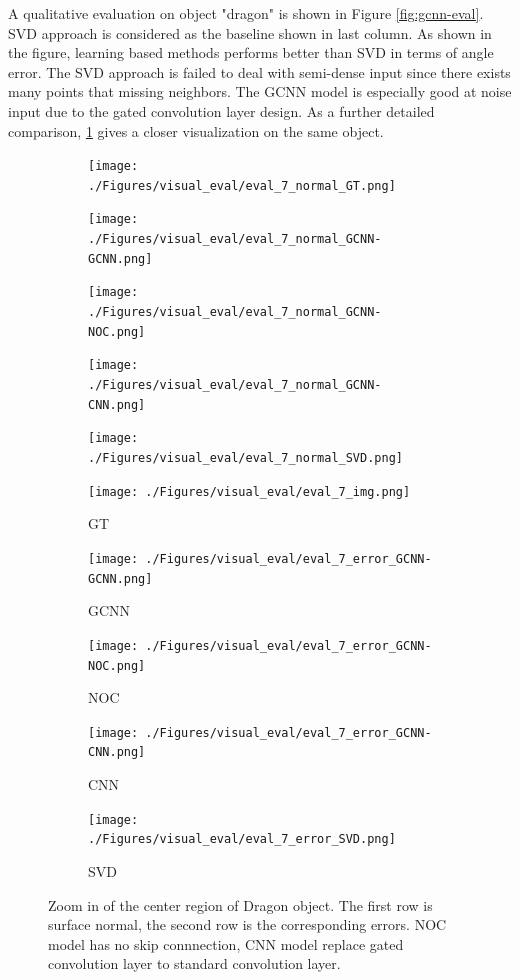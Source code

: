 \documentclass[border=15pt, multi, tikz]{article}
\begin{document}
A qualitative evaluation on object "dragon" is shown in Figure \ref{fig:gcnn-eval}. SVD approach is considered as the baseline shown in last column. As shown in the figure, learning based methods performs better than SVD in terms of angle error. The SVD approach is failed to deal with semi-dense input since there exists many points that missing neighbors. The GCNN model is especially good at noise input due to the gated convolution layer design. As a further detailed comparison, \ref{fig:gcnn-eval-synthetic-zoom-in} gives a closer visualization on the same object. 



\begin{figure}[H]
	\centering
	\begin{subfigure}[b]{0.18\linewidth}
		\texttt{[image: ./Figures/visual\_eval/eval\_7\_normal\_GT.png]}
	\end{subfigure}
	\begin{subfigure}[b]{0.18\linewidth}
		\texttt{[image: ./Figures/visual\_eval/eval\_7\_normal\_GCNN-GCNN.png]}
	\end{subfigure}
	\begin{subfigure}[b]{0.18\linewidth}
		\texttt{[image: ./Figures/visual\_eval/eval\_7\_normal\_GCNN-NOC.png]}
	\end{subfigure}
	\begin{subfigure}[b]{0.18\linewidth}
		\texttt{[image: ./Figures/visual\_eval/eval\_7\_normal\_GCNN-CNN.png]}
	\end{subfigure}
	\begin{subfigure}[b]{0.18\linewidth}
		\texttt{[image: ./Figures/visual\_eval/eval\_7\_normal\_SVD.png]}
	\end{subfigure}
	
	\begin{subfigure}[b]{0.18\linewidth}
		\texttt{[image: ./Figures/visual\_eval/eval\_7\_img.png]}
		\caption{GT}
	\end{subfigure}
	\begin{subfigure}[b]{0.18\linewidth}
		\texttt{[image: ./Figures/visual\_eval/eval\_7\_error\_GCNN-GCNN.png]}
		\caption{GCNN}
	\end{subfigure}
	\begin{subfigure}[b]{0.18\linewidth}
		\texttt{[image: ./Figures/visual\_eval/eval\_7\_error\_GCNN-NOC.png]}
		\caption{NOC}
	\end{subfigure}
	\begin{subfigure}[b]{0.18\linewidth}
		\texttt{[image: ./Figures/visual\_eval/eval\_7\_error\_GCNN-CNN.png]}
		\caption{CNN}
	\end{subfigure}
	\begin{subfigure}[b]{0.18\linewidth}
		\texttt{[image: ./Figures/visual\_eval/eval\_7\_error\_SVD.png]}
		\caption{SVD}
	\end{subfigure}
	
	\caption{Zoom in of the center region of Dragon object. The first row is surface normal, the second row is the corresponding errors. NOC model has no skip connnection, CNN model replace gated convolution layer to standard convolution layer.}
	\label{fig:gcnn-eval-synthetic-zoom-in}
\end{figure}
\end{document}
